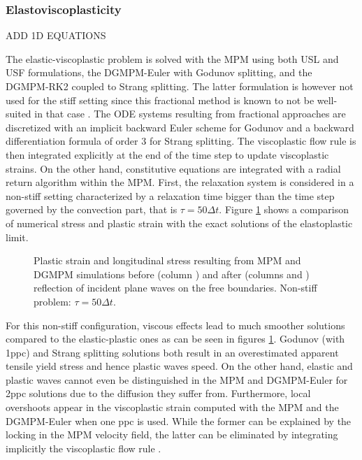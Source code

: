 \subsubsection{Elastoviscoplasticity}
ADD 1D EQUATIONS

The elastic-viscoplastic problem is solved with the MPM using both USL and USF formulations, the DGMPM-Euler with Godunov splitting, and the DGMPM-RK2 coupled to Strang splitting. The latter formulation is however not used for the stiff setting since this fractional method is known to not be well-suited in that case \cite{Thomas_EVP,Leveque_stiff}. The ODE systems resulting from fractional approaches are discretized with an implicit backward Euler scheme for Godunov and a backward differentiation formula of order 3 for Strang splitting. The viscoplastic flow rule is then integrated explicitly at the end of the time step to update viscoplastic strains. On the other hand, constitutive equations are integrated with a radial return algorithm \cite{Simo} within the MPM. First, the relaxation system is considered in a non-stiff setting characterized by a relaxation time bigger than the time step governed by the convection part, that is $\tau=50\Delta t$. Figure \ref{fig:nonstiff_elastoviscoplastic_RP} shows a comparison of numerical stress and plastic strain with the exact solutions of the elastoplastic limit.
\begin{figure}[h!]
  \centering
  { \label{subfig:evp_nonstiff1}}
  { \label{subfig:evp_nonstiff2}}
  { \label{subfig:evp_nonstiff3}}
  {}
  \caption{Plastic strain and longitudinal stress resulting from MPM and DGMPM simulations before (column ) and after (columns  and ) reflection of incident plane waves on the free boundaries. Non-stiff problem: $\tau=50\Delta t$.}
  \label{fig:nonstiff_elastoviscoplastic_RP}
\end{figure}
For this non-stiff configuration, viscous effects lead to much smoother solutions compared to the elastic-plastic ones as can be seen in figures \ref{fig:nonstiff_elastoviscoplastic_RP}. Godunov (with 1ppc) and Strang splitting solutions both result in an overestimated apparent tensile yield stress and hence plastic waves speed. On the other hand, elastic and plastic waves cannot even be distinguished in the MPM and DGMPM-Euler for 2ppc solutions due to the diffusion they suffer from. Furthermore, local overshoots appear in the viscoplastic strain computed with the MPM and the DGMPM-Euler when one ppc is used. While the former can be explained by the locking in the MPM velocity field, the latter can be eliminated by integrating implicitly the viscoplastic flow rule \cite{Thomas_EVP}.

